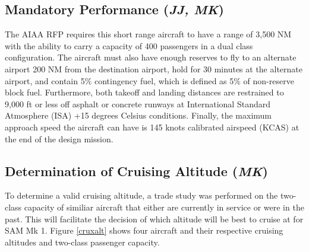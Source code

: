 \subsection{Mandatory Performance (\textit{JJ, MK})}
\label{mand}
The AIAA RFP \cite{RFP} requires this short range aircraft to have a range of 3,500 NM with the ability to carry a capacity of 400 passengers in a dual class configuration. The aircraft must also have enough reserves to fly to an alternate airport 200 NM from the destination airport, hold for 30 minutes at the alternate airport, and contain 5\% contingency fuel, which is defined as 5\% of non-reserve block fuel. Furthermore, both takeoff and landing distances are restrained to 9,000 ft or less off asphalt or concrete runways at International Standard Atmosphere (ISA) +15 degrees Celsius conditions. Finally, the maximum approach speed the aircraft can have is 145 knots calibrated airspeed (KCAS) at the end of the design mission. 



\subsection{Determination of Cruising Altitude (\textit{MK})}
To determine a valid cruising altitude, a trade study was performed on the two-class capacity of similiar aircraft that either are currently in service or were in the past. This will facilitate the decision of which altitude will be best to cruise at for SAM Mk 1. Figure \ref{cruxalt} shows four aircraft and their respective cruising altitudes and two-class passenger capacity\cite{butterworth}.

